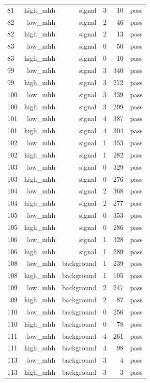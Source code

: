 \begin{table}[htbp]
{\begin{tabular}{lrrrrr}
81 & high\_mhh & signal & 3 & 10 & pass \\
82 & low\_mhh & signal & 2 & 46 & pass \\
82 & high\_mhh & signal & 2 & 13 & pass \\
83 & low\_mhh & signal & 0 & 50 & pass \\
83 & high\_mhh & signal & 0 & 10 & pass \\
99 & low\_mhh & signal & 3 & 340 & pass \\
99 & high\_mhh & signal & 3 & 272 & pass \\
100 & low\_mhh & signal & 3 & 339 & pass \\
100 & high\_mhh & signal & 3 & 299 & pass \\
101 & low\_mhh & signal & 4 & 387 & pass \\
101 & high\_mhh & signal & 4 & 304 & pass \\
102 & low\_mhh & signal & 1 & 353 & pass \\
102 & high\_mhh & signal & 1 & 282 & pass \\
103 & low\_mhh & signal & 0 & 329 & pass \\
103 & high\_mhh & signal & 0 & 276 & pass \\
104 & low\_mhh & signal & 2 & 368 & pass \\
104 & high\_mhh & signal & 2 & 277 & pass \\
105 & low\_mhh & signal & 0 & 353 & pass \\
105 & high\_mhh & signal & 0 & 286 & pass \\
106 & low\_mhh & signal & 1 & 328 & pass \\
106 & high\_mhh & signal & 1 & 289 & pass \\
108 & low\_mhh & background & 1 & 239 & pass \\
108 & high\_mhh & background & 1 & 105 & pass \\
109 & low\_mhh & background & 2 & 247 & pass \\
109 & high\_mhh & background & 2 & 87 & pass \\
110 & low\_mhh & background & 0 & 256 & pass \\
110 & high\_mhh & background & 0 & 78 & pass \\
111 & low\_mhh & background & 4 & 261 & pass \\
111 & high\_mhh & background & 4 & 98 & pass \\
113 & low\_mhh & background & 3 & 4 & pass \\
113 & high\_mhh & background & 3 & 3 & pass \\

\end{tabular}}
\end{table}
